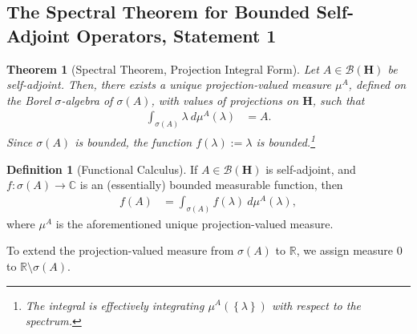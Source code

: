 \documentclass[10pt]{extarticle}
\newcommand{\R}{\mathbb{R}}
\newcommand{\C}{\mathbb{C}}
\newcommand{\set}[1]{\left\{#1\right\}}
\theoremstyle{plain}
\newtheorem*{theorem}{Theorem}%
\theoremstyle{definition}
\newtheorem*{definition}{Definition}
\theoremstyle{remark}
\renewcommand{\newline}{\hfill\break}
\begin{document}
  \subsection{The Spectral Theorem for Bounded Self-Adjoint Operators, Statement 1}%
  \begin{theorem}[Spectral Theorem, Projection Integral Form]
    Let $A\in \mathcal{B}\left(\mathbf{H}\right)$ be self-adjoint. Then, there exists a unique projection-valued measure $\mu^{A}$, defined on the Borel $\sigma$-algebra of $\sigma(A)$, with values of projections on $\mathbf{H}$, such that
    \begin{align*}
      \int_{\sigma(A)}^{} \lambda\:d\mu^{A}(\lambda) &= A.
    \end{align*}
    Since $\sigma(A)$ is bounded, the function $f(\lambda) := \lambda$ is bounded.\footnote{The integral is effectively integrating $\mu^{A}\left(\set{\lambda}\right)$ with respect to the spectrum.}
  \end{theorem}
  \begin{definition}[Functional Calculus]
    If $A\in \mathcal{B}\left(\mathbf{H}\right)$ is self-adjoint, and $f: \sigma(A)\rightarrow \C$ is an (essentially) bounded measurable function, then
    \begin{align*}
      f(A) &= \int_{\sigma(A)}^{} f(\lambda)\:d\mu^{A}(\lambda),
    \end{align*}
    where $\mu^{A}$ is the aforementioned unique projection-valued measure.
  \end{definition}
  To extend the projection-valued measure from $\sigma(A)$ to $\R$, we assign measure $0$ to $\R\setminus \sigma(A)$.\newline
\end{document}
